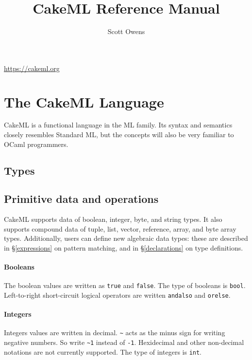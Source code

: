 \documentclass{article}
\title{CakeML Reference Manual}
\author{Scott Owens}
\begin{document}
\sloppy
\maketitle
\vspace{-24pt}
\begin{center}\url{https://cakeml.org}\end{center}
\vspace{12pt}

\section{The CakeML Language}

CakeML is a functional language in the ML family. Its syntax and semantics closely resembles Standard ML, but the concepts will also be very familiar to OCaml programmers.

\subsection{Types}



\subsection{Primitive data and operations}

CakeML supports data of boolean, integer, byte, and string types. It also supports compound data of tuple, list, vector, reference, array, and byte array types. Additionally, users can define new algebraic data types: these are described in  \S\ref{expressions} on pattern matching, and in \S\ref{declarations} on type definitions.

\paragraph{Booleans} The boolean values are written as \texttt{true} and \texttt{false}. The type of booleans is \texttt{bool}. Left-to-right short-circuit logical operators are written \texttt{andalso} and \texttt{orelse}.

\paragraph{Integers} Integers values are written in decimal. \verb|~| acts as the minus sign for writing negative numbers. So write \verb|~1| instead of \verb|-1|. Hexidecimal and other non-decimal notations are not currently supported. The type of integers is \texttt{int}.
\end{document}

